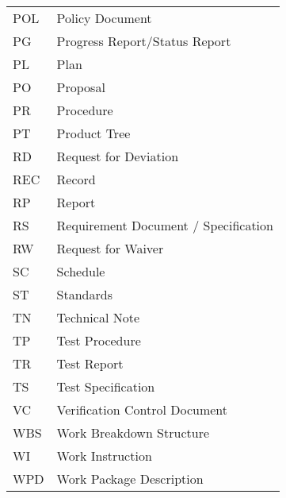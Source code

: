 \begin{longtable}{l l}
POL & Policy Document \\
PG & Progress Report/Status Report \\
PL & Plan \\
PO & Proposal \\
PR & Procedure \\
PT & Product Tree \\
RD & Request for Deviation \\
REC & Record \\
RP & Report \\
RS & Requirement Document / Specification \\
RW & Request for Waiver \\
SC & Schedule \\
ST & Standards \\
TN & Technical Note \\
TP & Test Procedure \\
TR & Test Report \\
TS & Test Specification \\
VC & Verification Control Document \\
WBS & Work Breakdown Structure \\
WI & Work Instruction \\
WPD & Work Package Description
\end{longtable}

